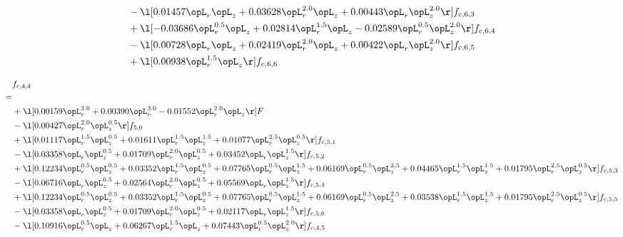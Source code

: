 \begin{alignat}{2}
& - \l[  0.01457 \opL_r \opL_z +  0.03628 \opL_r^{2.0} \opL_z +  0.00443 \opL_r \opL_z^{2.0}  \r] f_{c,6,3} \nonumber \\ 
& + \l[  -0.03686 \opL_r^{0.5} \opL_z +  0.02814 \opL_r^{1.5} \opL_z   -0.02589 \opL_r^{0.5} \opL_z^{2.0}  \r] f_{c,6,4} \nonumber \\ 
& - \l[  0.00728 \opL_r \opL_z +  0.02419 \opL_r^{2.0} \opL_z +  0.00422 \opL_r \opL_z^{2.0}  \r] f_{c,6,5} \nonumber \\ 
& + \l[  0.00938 \opL_r^{1.5} \opL_z  \r] f_{c,6,6} \nonumber \\ 
\end{alignat} 


\begin{alignat}{2} 
\label{eq:f_44_2} 
& f_{c,4,4} \nonumber \\ 
 = \\ 
& + \l[  0.00159 \opL_r^{2.0} +  0.00390 \opL_r^{3.0}   -0.01552 \opL_r^{2.0} \opL_z  \r] F \nonumber \\ 
& - \l[  0.00427 \opL_r^{2.0} \opL_z^{0.5}  \r] f_{5,0} \nonumber \\ 
& + \l[  0.01117 \opL_r^{1.5} \opL_z^{0.5} +  0.01611 \opL_r^{1.5} \opL_z^{1.5} +  0.01077 \opL_r^{2.5} \opL_z^{0.5}  \r] f_{c,5,1} \nonumber \\ 
& - \l[  0.03358 \opL_r \opL_z^{0.5} +  0.01709 \opL_r^{2.0} \opL_z^{0.5} +  0.03452 \opL_r \opL_z^{1.5}  \r] f_{c,5,2} \nonumber \\ 
& + \l[  0.12234 \opL_r^{0.5} \opL_z^{0.5} +  0.03352 \opL_r^{1.5} \opL_z^{0.5} +  0.07765 \opL_r^{0.5} \opL_z^{1.5} +  0.06169 \opL_r^{0.5} \opL_z^{2.5} +  0.04465 \opL_r^{1.5} \opL_z^{1.5} +  0.01795 \opL_r^{2.5} \opL_z^{0.5}  \r] f_{c,5,3} \nonumber \\ 
& - \l[  0.06716 \opL_r \opL_z^{0.5} +  0.02564 \opL_r^{2.0} \opL_z^{0.5} +  0.05569 \opL_r \opL_z^{1.5}  \r] f_{c,5,4} \nonumber \\ 
& + \l[  0.12234 \opL_r^{0.5} \opL_z^{0.5} +  0.03352 \opL_r^{1.5} \opL_z^{0.5} +  0.07765 \opL_r^{0.5} \opL_z^{1.5} +  0.06169 \opL_r^{0.5} \opL_z^{2.5} +  0.03538 \opL_r^{1.5} \opL_z^{1.5} +  0.01795 \opL_r^{2.5} \opL_z^{0.5}  \r] f_{c,5,5} \nonumber \\ 
& - \l[  0.03358 \opL_r \opL_z^{0.5} +  0.01709 \opL_r^{2.0} \opL_z^{0.5} +  0.02117 \opL_r \opL_z^{1.5}  \r] f_{c,5,6} \nonumber \\ 
& - \l[  0.10916 \opL_r^{0.5} \opL_z +  0.06267 \opL_r^{1.5} \opL_z +  0.07443 \opL_r^{0.5} \opL_z^{2.0}  \r] f_{c,4,5} \nonumber \\ 

\end{alignat}
